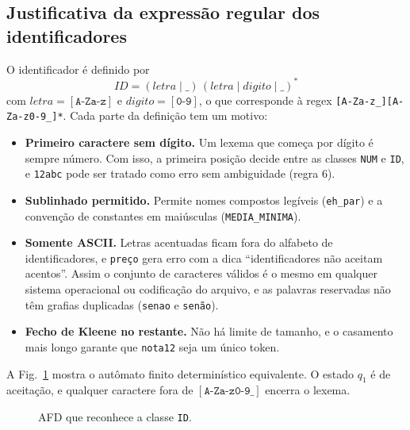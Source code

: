 \documentclass[conference]{IEEEtran}
\begin{document}
\subsection{Justificativa da expressão regular dos identificadores}
O identificador é definido por
\[
\mathit{ID} = (\mathit{letra} \mid \_)\,(\mathit{letra} \mid \mathit{digito} \mid \_)^{*}
\]
com $\mathit{letra} = [\texttt{A-Za-z}]$ e $\mathit{digito} = [\texttt{0-9}]$,
o que corresponde à regex \texttt{[A-Za-z\_][A-Za-z0-9\_]*}. Cada parte da
definição tem um motivo:

\begin{itemize}
\item \textbf{Primeiro caractere sem dígito.} Um lexema que começa por dígito
é sempre número. Com isso, a primeira posição decide entre as classes
\texttt{NUM} e \texttt{ID}, e \texttt{12abc} pode ser tratado como erro
sem ambiguidade (regra 6).
\item \textbf{Sublinhado permitido.} Permite nomes compostos legíveis
(\texttt{eh\_par}) e a convenção de constantes em maiúsculas
(\texttt{MEDIA\_MINIMA}).
\item \textbf{Somente ASCII.} Letras acentuadas ficam fora do alfabeto de
identificadores, e \texttt{preço} gera erro com a dica ``identificadores não
aceitam acentos''. Assim o conjunto de caracteres válidos é o mesmo em
qualquer sistema operacional ou codificação do arquivo, e as palavras
reservadas não têm grafias duplicadas (\texttt{senao} e \texttt{senão}).
\item \textbf{Fecho de Kleene no restante.} Não há limite de tamanho, e o
casamento mais longo garante que \texttt{nota12} seja um único token.
\end{itemize}

A Fig.~\ref{fig:afd} mostra o autômato finito determinístico equivalente. O
estado $q_1$ é de aceitação, e qualquer caractere fora de
$[\texttt{A-Za-z0-9\_}]$ encerra o lexema.

\begin{figure}[!t]
\centering
{}
\caption{AFD que reconhece a classe \texttt{ID}.}
\label{fig:afd}
\end{figure}
\end{document}
